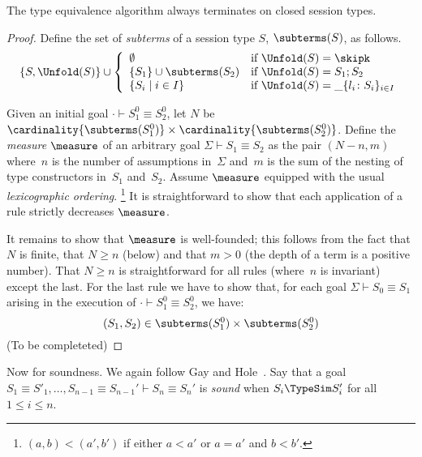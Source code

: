 \begin{lemma}[Termination]
  \label{lem:alg-terminates}
  The type equivalence algorithm always terminates on closed session
  types.
\end{lemma}
%
\begin{proof}
  Define the set of \emph{subterms} of a session type $S$,
  $\subterms(S)$, as follows.
  \begin{equation*}
    \{S,\Unfold(S)\} \cup\left\{
      \begin{array}{ll}
        \emptyset & \text{if } \Unfold(S) = \skipk
        \\
        \{S_1\}\cup\subterms(S_2) & \text{if } \Unfold(S) = S_1;S_2
        \\
        \{S_i\mid i\in I\}  & \text{if } \Unfold(S) = \mathsf{\_}\{l_i\colon S_i\}_{i\in I}
      \end{array}
      \right.
  \end{equation*}

  Given an initial goal $\cdot\vdash S^0_1\equiv S^0_2$, let $N$ be
  $\cardinality{\subterms(S^0_1)} \times
  \cardinality{\subterms(S^0_2)}$.
  Define the \emph{measure} $\measure$ of an arbitrary goal
  $\Sigma \vdash S_1 \equiv S_2$ as the pair $(N-n,m)$ where~$n$ is
  the number of assumptions in~$\Sigma$ and~$m$ is the sum of the
  nesting of type constructors in~$S_1$ and~$S_2$. Assume $\measure$
  equipped with the usual \emph{lexicographic ordering}.%
  \footnote{$(a,b)<(a',b')$ if either $a<a'$ or $a=a'$ and $b<b'$.}
  It is straightforward to show that each application of a rule
  strictly decreases $\measure$.

  It remains to show that $\measure$ is well-founded; this follows
  from the fact that $N$ is finite, that $N\ge n$ (below) and that
  $m>0$ (the depth of a term is a positive number). That $N\ge n$ is
  straightforward for all rules (where~$n$ is invariant) except the
  last. For the last rule we have to show that, for each goal
  $\Sigma \vdash S_0\equiv S_1$ arising in the execution of
  $\cdot\vdash S^0_1\equiv S^0_2$, we have:
  \begin{equation*}
    (S_1,S_2) \in \subterms(S_1^0) \times \subterms(S_2^0)
  \end{equation*}
  (To be completeted)
\end{proof}

Now for soundness. We again follow Gay and
Hole~\cite{DBLP:journals/acta/GayH05}.
%
Say that a goal
$S_1 \equiv S'_1,\dots,S_{n-1}\equiv S_{n-1}' \vdash S_n \equiv S_n'$
is \emph{sound} when $S_i \TypeSim S_i'$ for all $1\le i\le n$.

